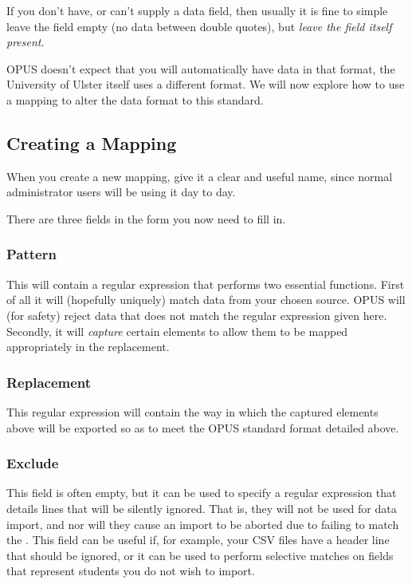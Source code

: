 \documentclass[12 pt]{book}
\begin{document}
If you don't have, or can't supply a data field, then usually it is fine to
simple leave the field empty (no data between double quotes), but \emph{leave
the field itself present}.

OPUS doesn't expect that you will automatically have data in that format, the
University of Ulster itself uses a different format. We will now explore how
to use a mapping to alter the data format to this standard.

\subsection{Creating a Mapping}

When you create a new mapping, give it a clear and useful name, since normal
administrator users will be using it day to day.


There are three fields in the form you now need to fill in.

\subsubsection{Pattern}

This will contain a regular expression that performs two essential functions.
First of all it will (hopefully uniquely) match data from your chosen source.
OPUS will (for safety) reject data that does not match the regular expression
given here. Secondly, it will \emph{capture} certain elements to allow them to
be mapped appropriately in the replacement.

\subsubsection{Replacement}

This regular expression will contain the way in which the captured elements
above will be exported so as to meet the OPUS standard format detailed above.

\subsubsection{Exclude}

This field is often empty, but it can be used to specify a regular expression
that details lines that will be silently ignored. That is, they will not be
used for data import, and nor will they cause an import to be aborted due to
failing to match the . This field can be useful if, for 
example, your CSV files have a header line that should be ignored, or it can
be used to perform selective matches on fields that represent students you
do not wish to import.
\end{document}
